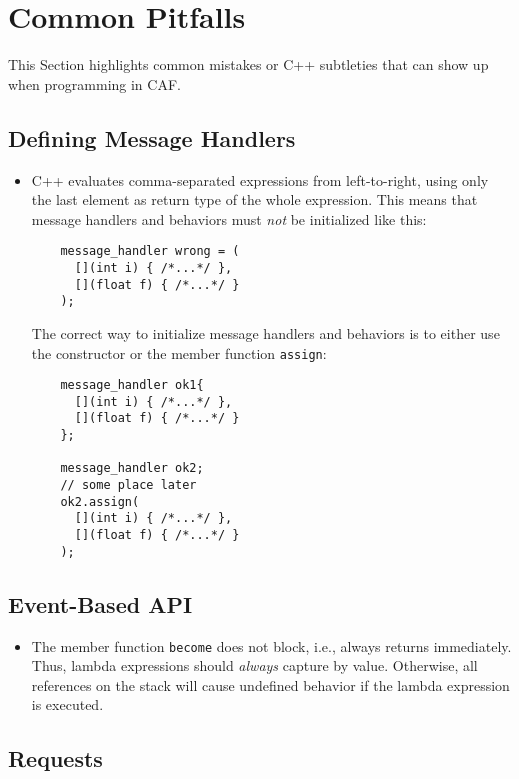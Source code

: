 \section{Common Pitfalls}
\label{pitfalls}

This Section highlights common mistakes or C++ subtleties that can show up when
programming in CAF.

\subsection{Defining Message Handlers}

\begin{itemize}
\item C++ evaluates comma-separated expressions from left-to-right, using only
  the last element as return type of the whole expression. This means that
    message handlers and behaviors must \emph{not} be initialized like this:
    \begin{lstlisting}
    message_handler wrong = (
      [](int i) { /*...*/ },
      [](float f) { /*...*/ }
    );
    \end{lstlisting}
    The correct way to initialize message handlers and behaviors is to either
    use the constructor or the member function \lstinline^assign^:
    \begin{lstlisting}
    message_handler ok1{
      [](int i) { /*...*/ },
      [](float f) { /*...*/ }
    };

    message_handler ok2;
    // some place later
    ok2.assign(
      [](int i) { /*...*/ },
      [](float f) { /*...*/ }
    );
    \end{lstlisting}
\end{itemize}

\subsection{Event-Based API}

\begin{itemize}
\item The member function \lstinline^become^ does not block, i.e., always
  returns immediately. Thus, lambda expressions should \textit{always} capture
    by value. Otherwise, all references on the stack will cause undefined
    behavior if the lambda expression is executed.
\end{itemize}

\subsection{Requests}

